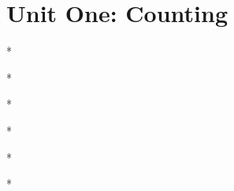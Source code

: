 \label{13-0304}

% 





% 



\noindent

\section{Unit One: Counting}

\begin{center} * \end{center}
\begin{center} *\space\space\space\space* \end{center}
\begin{center} *\space\space\space\space*\space\space\space\space* \end{center}
\begin{center} *\space\space\space\space*\space\space\space\space*\space\space\space\space* \end{center}
\begin{center} *\space\space\space\space*\space\space\space\space*\space\space\space\space*\space\space\space\space* \end{center}
\begin{center} *\space\space\space\space*\space\space\space\space*\space\space\space\space*\space\space\space\space*\space\space\space\space* \end{center}
\newline \newline


